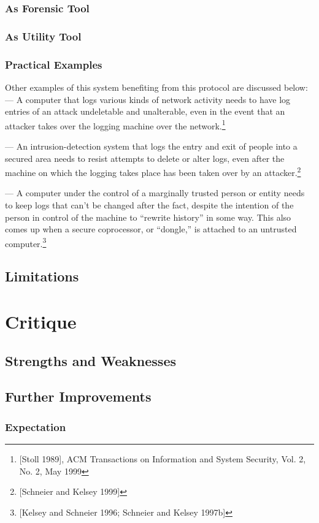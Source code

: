 \documentclass[12pt, letter]{article}
\begin{document}
\subsubsection{As Forensic Tool}

\blindtext

\subsubsection{As Utility Tool}

\blindtext

\subsubsection{Practical Examples}

Other examples of this system benefiting from this protocol are discussed below:\\

— A computer that logs various kinds of network activity needs to have log entries of an attack undeletable and unalterable, even in the event that an attacker takes over the logging machine over the network.\footnote{[Stoll 1989], ACM Transactions on Information and System Security, Vol. 2, No. 2, May 1999}

— An intrusion-detection system that logs the entry and exit of people into a secured area needs to resist attempts to delete or alter logs, even after the machine on which the logging takes place has been taken over by an attacker.\footnote{[Schneier and Kelsey 1999]}

— A computer under the control of a marginally trusted person or entity needs to keep logs that can’t be changed after the fact, despite the intention of the person in control of the machine to “rewrite history” in some way. This also comes up when a secure coprocessor, or “dongle,” is attached to an untrusted computer.\footnote{[Kelsey and Schneier 1996; Schneier and Kelsey 1997b]}


\subsection{Limitations}

\blindtext

\section{Critique}

\blindtext

\subsection{Strengths and Weaknesses}

\blindtext

\subsection{Further Improvements}

\blindtext

\subsubsection{Expectation}
\end{document}
